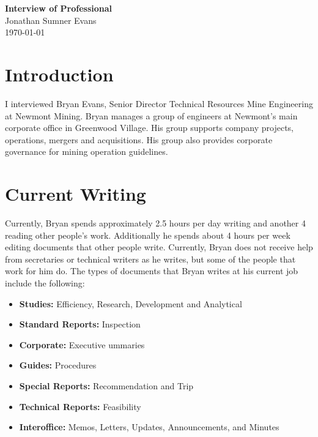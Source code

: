 \documentclass[11pt]{article}
\begin{document}
\begin{center}
    \textbf{Interview of Professional} \\
    Jonathan Sumner Evans \\
    \today
\end{center}

\section{Introduction}

I interviewed Bryan Evans, Senior Director Technical Resources Mine Engineering at Newmont Mining.
Bryan manages a group of engineers at Newmont's main corporate office\deleted{,} in
Greenwood Village. His group supports company projects, operations, 
mergers\added{,} and acquisitions. His group also provides corporate governance for mining
operation guidelines.

\section{Current Writing}

Currently, Bryan spends approximately 2.5 hours per day writing and another 4 reading other
people's work. Additionally he spends about 4 hours per week editing documents that other people
write. Currently, Bryan does not receive help from secretaries or technical writers as he writes,
but some of the people that work for him do. The types of documents that Bryan writes at his current
job include the following:

\begin{itemize}
    \item \textbf{Studies:} Efficiency, Research, Development\added{,} and Analytical
    \item \textbf{Standard Reports:} Inspection
    \item \textbf{Corporate:} Executive ummaries
    \item \textbf{Guides:} Procedures
    \item \textbf{Special Reports:} Recommendation and Trip
    \item \textbf{Technical Reports:} Feasibility
    \item \textbf{Interoffice:} Memos, Letters, Updates, Announcements, and Minutes
\end{itemize}
\end{document}
